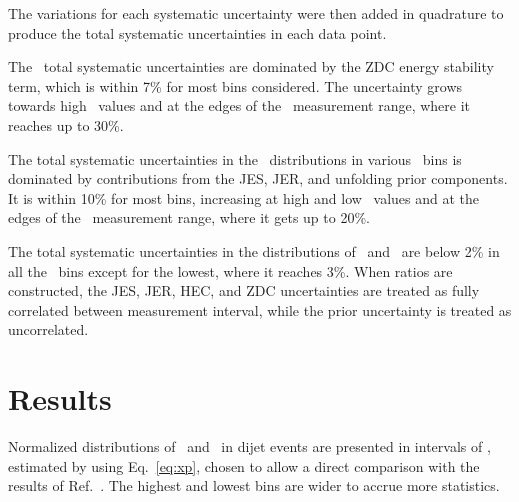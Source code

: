 \documentclass[PAPER, atlasdraft=false, USenglish, cernpreprint]{atlasdoc}
\begin{document}
The variations for each systematic uncertainty were then added in quadrature to produce the total systematic uncertainties in each data point. 








The \EZDC\ total systematic uncertainties are dominated by the ZDC energy stability term, which is within 7\% for most bins considered.  The uncertainty grows towards high \EZDC\ values and at the edges of the \xp\ measurement range, where it reaches up to 30\%. 


The total systematic uncertainties in the \ETPB\ distributions in various \xp\ bins is dominated by contributions from the JES, JER, and unfolding prior components.  It is within 10\% for most bins, increasing at high and low \ETPB\ values and at the edges of the \xp\ measurement range, where it gets up to 20\%. 


The total systematic uncertainties in the distributions of \AZDC\ and \EATPB\ are below 2\% in all the \xp\ bins except for the lowest, where it reaches 3\%.
When ratios are constructed, the JES, JER, HEC, and ZDC uncertainties are treated as fully correlated between measurement interval, while the prior uncertainty is treated as uncorrelated.















 \section{Results}




Normalized distributions of \EZDC\ and \ETPB\ in dijet events are presented in intervals of \xp
, estimated by using Eq.~\ref{eq:xp}, chosen to allow a direct comparison with the results of Ref.~\cite{ATLAS:2023zfx}. The highest and lowest bins are wider to accrue more statistics.
\end{document}
